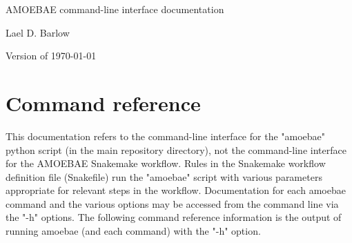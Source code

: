 \documentclass[12pt,letterpaper]{article}
\begin{document}
\begin{titlepage}
	\centering
    {\huge AMOEBAE command-line interface documentation\par}
	\vspace{2cm}
    {\Large Lael D. Barlow\par}
	\vfill
	{\large Version of \today\par}
\end{titlepage}

\newpage
\tableofcontents

\newpage
{}


\section{Command reference}

This documentation refers to the command-line interface for the "amoebae"
    python script (in the main repository directory), not the command-line
    interface for the AMOEBAE Snakemake workflow. Rules in the Snakemake
    workflow definition file (Snakefile) run the "amoebae" script with various
    parameters appropriate for relevant steps in the workflow.  Documentation
    for each amoebae command and the various options may be accessed from the
    command line via the "-h" options. The following command reference
    information is the output of running amoebae (and each command) with the
    "-h" option.





\newpage

% 
\end{document}
